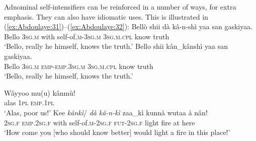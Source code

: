 \documentclass[output=paper]{langscibook}
\begin{document}
Adnominal self-intensifiers can be reinforced in a number of ways, for extra emphasis. They can also have idiomatic uses. This is illustrated in (\ref{ex:Abdoulaye:31})--(\ref{ex:Abdoulaye:32}):
\ea%
    \label{ex:Abdoulaye:31}
    \ea \label{ex:Abdoulaye:31a}
    \gll  Bellò  shii  dà  kâ-n-shì  yaa  san  gaskiyaa.\\
    Bello  \textsc{3sg.m}  with  self-of.\textsc{m-3sg.m}  \textsc{3sg.m.cpl}  know  truth\\
    \glt `Bello, really he himself, knows the truth.’
    \ex \label{ex:Abdoulaye:31b}
    \gll Bello  shii  kân\_kânshì  yaa  san  gaskiyaa.\\
    Bello  \textsc{3sg.m}  \textsc{emp-emp.3sg.m}  \textsc{3sg.m.cpl}  know  truth\\
    \glt `Bello, really he himself, knows the truth.’
    \z
\z

   
\ea%
    \label{ex:Abdoulaye:32}
    \ea \label{ex:Abdoulaye:32a}
    \gll Wâyyoo  mu(u)  kânmù!\\
    alas  \textsc{1pl}  \textsc{emp.1pl}\\
    \glt `Alas, poor us!’
    \ex \label{ex:Abdoulaye:32b}
    \gll  Kee  \textit{kânkì}/  \textit{dà}  \textit{kâ-n-kì}  zaa\_kì  kunnà  wutaa  à  nân!\\
     \textsc{2sg.f}  \textsc{emp.2sg.f}  with  self-of.\textsc{m-2sg.f}  \textsc{fut-2sg.f}  light  fire  at  here\\
    \glt `How come you [who should know better] would light a fire in this place!’
    \z
\z 
\end{document}
